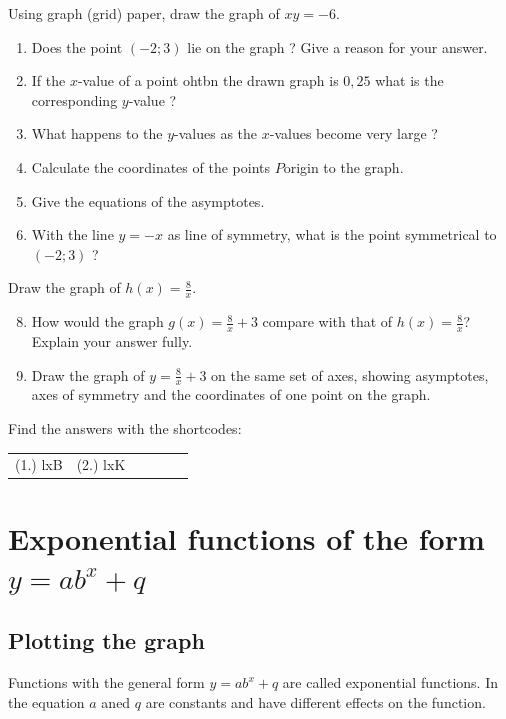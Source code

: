 \begin{exercises}{}
{
Using graph (grid) paper, draw the graph of $xy=-6$.
    \begin{enumerate}[noitemsep, label=\textbf{\arabic*}. ] 
    \item Does the point $(-2; 3)$ lie on the graph ? Give a reason for your answer.

    \item If the $x$-value of a point ohtbn the drawn graph is $0,25$ what is the corresponding $y$-value ?
    \item What happens to the $y$-values as the $x$-values become very large ?
\item Calculate the coordinates of the points $P$origin to the graph.
\item Give the equations of the asymptotes.
    \item With the line $y=-x$ as line of symmetry, what is the point symmetrical to $(-2; 3)$ ?
    \end{enumerate}
Draw the graph of $h(x)=\frac{8}{x}$.
    \begin{enumerate}[noitemsep, label=\textbf{\arabic*}. ] 
\setcounter{enumi}{7}
    \item How would the graph $g(x)=\frac{8}{x}+3$ compare with that of $h(x)=\frac{8}{x}$? Explain your answer fully.
    \item Draw the graph of $y=\frac{8}{x}+3$ on the same set of axes, showing asymptotes, axes of symmetry and the coordinates of one point on the graph.
    \end{enumerate}


\par {} Find the answers with the shortcodes:
\par \begin{tabular}[h]{cccccc}
(1.) lxB  &  (2.) lxK  & \end{tabular}
}
\end{exercises}

\section{Exponential functions of the form $y=ab^{x}+q$}

\subsection*{Plotting the graph}         
Functions with the general form $y=ab^{x}+q$ are called exponential functions. In the equation $a$ aned $q$ are constants and have different effects on the function.

